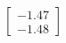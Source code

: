 \documentclass[preview]{standalone}
\begin{document}
\begin{align*}
\begin{bmatrix} -1.47 \\ -1.48 \end{bmatrix}
\end{align*}
\end{document}
